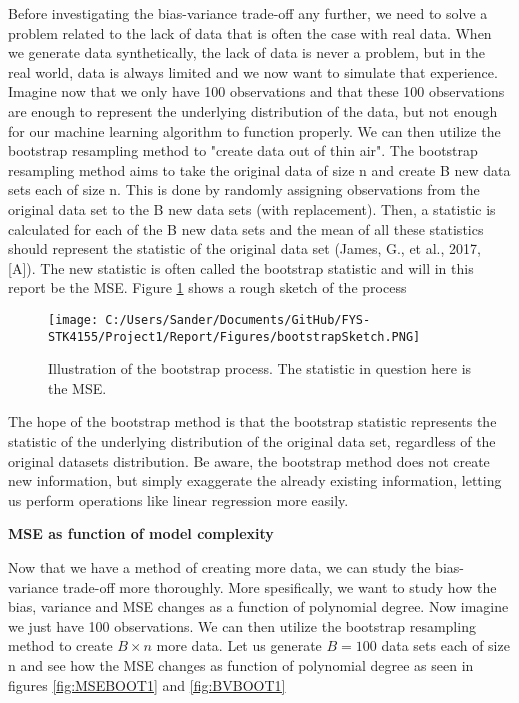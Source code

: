 \documentclass[12pt,a4paper]{article}
\begin{document}
\noindent Before investigating the bias-variance trade-off any further, we need to solve a problem related to the lack of data that is often the case with real data. When we generate data synthetically, the lack of data is never a problem, but in the real world, data is always limited and we now want to simulate that experience. Imagine now that we only have 100 observations and that these 100 observations are enough to represent the underlying distribution of the data, but not enough for our machine learning algorithm to function properly. We can then utilize the bootstrap resampling method to "create data out of thin air". The bootstrap resampling method aims to take the original data of size n and create B new data sets each of size n. This is done by randomly assigning observations from the original data set to the B new data sets (with replacement). Then, a statistic is calculated for each of the B new data sets and the mean of all these statistics should represent the statistic of the original data set (James, G., et al., 2017, [A]). The new statistic is often called the bootstrap statistic and will in this report be the MSE. Figure \ref{fig:Bootsketch} shows a rough sketch of the process

\begin{figure}[H]
\centering
\texttt{[image: C:/Users/Sander/Documents/GitHub/FYS-STK4155/Project1/Report/Figures/bootstrapSketch.PNG]}
\caption{\label{fig:Bootsketch} Illustration of the bootstrap process. The statistic in question here is the MSE.}
\end{figure}

\noindent The hope of the bootstrap method is that the bootstrap statistic represents the statistic of the underlying distribution of the original data set, regardless of the original datasets distribution. Be aware, the bootstrap method does not create new information, but simply exaggerate the already existing information, letting us perform operations like linear regression more easily.

\begin{center}
\large{\textbf{MSE as function of model complexity}}
\end{center}

\noindent Now that we have a method of creating more data, we can study the bias-variance trade-off more thoroughly. More spesifically, we want to study how the bias, variance and MSE changes as a function of polynomial degree. Now imagine we just have 100 observations. We can then utilize the bootstrap resampling method to create $B \times n$ more data. Let us generate $B = 100$ data sets each of size n and see how the MSE changes as function of polynomial degree as seen in figures \ref{fig:MSEBOOT1} and \ref{fig:BVBOOT1}
\end{document}
